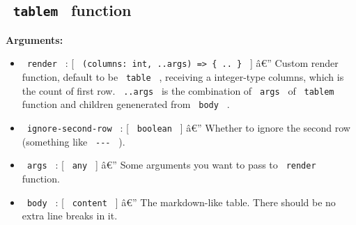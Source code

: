 \begin{Shaded}
\begin{Highlighting}[]

\NormalTok{    )}
\NormalTok{  \}}
\NormalTok{)}

\NormalTok{\#three{-}line{-}table[}
\NormalTok{  | {-}{-}{-}{-}{-}{-} | {-}{-}{-}{-}{-}{-}{-}{-}{-}{-} | {-}{-}{-}{-}{-}{-}{-}{-} | {-}{-}{-}{-}{-}{-}{-} |}
\NormalTok{]}
\end{Highlighting}
\end{Shaded}


\subsection{\texorpdfstring{\texttt{\ tablem\ }
function}{ tablem  function}}\label{tablem-function}

\begin{Shaded}
\begin{Highlighting}[]
\end{Highlighting}
\end{Shaded}

\textbf{Arguments:}

\begin{itemize}
\tightlist
\item
  \texttt{\ render\ } : {[}
  \texttt{\ (columns:\ int,\ ..args)\ =\textgreater{}\ \{\ ..\ \}\ } {]}
  â€'' Custom render function, default to be \texttt{\ table\ } ,
  receiving a integer-type columns, which is the count of first row.
  \texttt{\ ..args\ } is the combination of \texttt{\ args\ } of
  \texttt{\ tablem\ } function and children genenerated from
  \texttt{\ body\ } .
\item
  \texttt{\ ignore-second-row\ } : {[} \texttt{\ boolean\ } {]} â€''
  Whether to ignore the second row (something like
  \texttt{\ \textbar{}-\/-\/-\textbar{}\ } ).
\item
  \texttt{\ args\ } : {[} \texttt{\ any\ } {]} â€'' Some arguments you
  want to pass to \texttt{\ render\ } function.
\item
  \texttt{\ body\ } : {[} \texttt{\ content\ } {]} â€'' The
  markdown-like table. There should be no extra line breaks in it.
\end{itemize}

